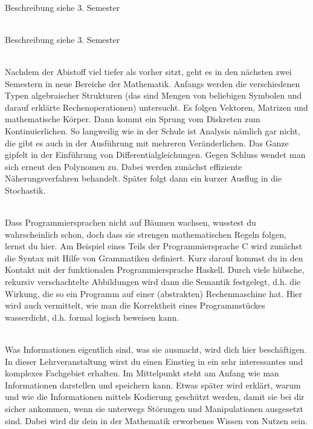 \textbf{} \\
Beschreibung siehe 3. Semester

\textbf{} \\
Beschreibung siehe 3. Semester



\textbf{} \\
Nachdem der Abistoff viel tiefer als vorher sitzt, geht es in den nächsten zwei Semestern in neue Bereiche der Mathematik.
Anfangs werden die verschiedenen Typen algebraischer Strukturen (das sind Mengen von beliebigen Symbolen und darauf erklärte Rechenoperationen) untersucht.
Es folgen Vektoren, Matrizen und mathematische Körper.
Dann kommt ein Sprung vom Diskreten zum Kontinuierlichen.
So langweilig wie in der Schule ist Analysis nämlich gar nicht, die gibt es auch in der Ausführung mit mehreren Veränderlichen.
Das Ganze gipfelt in der Einführung von Differentialgleichungen.
Gegen Schluss wendet man sich erneut den Polynomen zu.
Dabei werden zunächst effiziente Näherungsverfahren behandelt.
Später folgt dann ein kurzer Ausflug in die Stochastik.

\textbf{} \\
Dass Programmiersprachen nicht auf Bäumen wachsen, wusstest du wahrscheinlich schon, doch dass sie strengen mathematischen Regeln folgen, lernst du hier.
Am Beispiel eines Teils der Programmiersprache C wird zunächst die Syntax mit Hilfe von Grammatiken definiert.
Kurz darauf kommst du in den Kontakt mit der funktionalen Programmiersprache Haskell.
Durch viele hübsche, rekursiv verschachtelte Abbildungen wird dann die Semantik festgelegt, d.h. die Wirkung, die so ein Programm auf einer (abstrakten) Rechenmaschine hat.
Hier wird auch vermittelt, wie man die Korrektheit eines Programmstückes \glqq wasserdicht\grqq, d.h. formal logisch beweisen kann.

\textbf{} \\
Was Informationen eigentlich sind, was sie ausmacht, wird dich hier beschäftigen.
In dieser Lehrveranstaltung wirst du einen Einstieg in ein sehr interessantes und komplexes Fachgebiet erhalten.
Im Mittelpunkt steht am Anfang wie man Informationen darstellen und speichern kann.
Etwas später wird erklärt, warum und wie die Informationen mittels Kodierung geschützt werden, damit sie bei dir sicher ankommen, wenn sie unterwegs Störungen und Manipulationen ausgesetzt sind.
Dabei wird dir dein in der Mathematik erworbenes Wissen von Nutzen sein.

